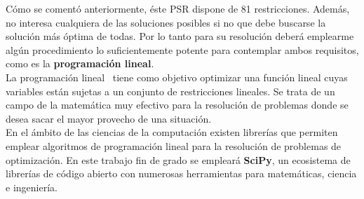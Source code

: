 Cómo se comentó anteriormente, éste PSR dispone de 81 restricciones. Además, no interesa cualquiera de las soluciones posibles si no que debe buscarse la solución más óptima de todas. Por lo tanto para su resolución deberá emplearme algún procedimiento lo suficientemente potente para contemplar ambos requisitos, como es la \textbf{programación lineal}.\\

La programación lineal~\cite{Loom64} tiene como objetivo optimizar una función lineal cuyas variables están sujetas a un conjunto de restricciones lineales.
Se trata de un campo de la matemática muy efectivo para la resolución de problemas donde se desea sacar el mayor provecho de una situación.\\

En el ámbito de las ciencias de la computación existen librerías que permiten emplear algoritmos de programación lineal para la resolución de problemas de optimización. En este trabajo fin de grado se empleará \textbf{SciPy}, un ecosistema de librerías de código abierto con numerosas herramientas para matemáticas, ciencia e ingeniería.

